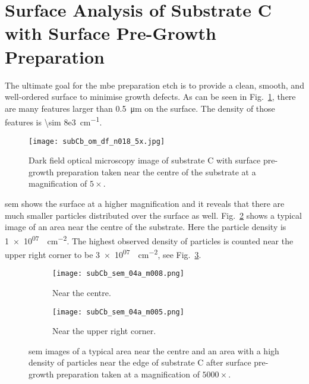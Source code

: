 \clearpage
\section[Surface Analysis of Substrate C with Surface Pre-Growth Preparation]{Surface Analysis of Substrate C with Surface Pre-Growth Preparation%
    }\label{sec:subCb}

The ultimate goal for the \ac{mbe} preparation etch is to provide a clean, smooth, and well-ordered surface to minimise growth defects. As can be seen in Fig.~\ref{fig:subCb_om_df}, there are many features larger than \SI{0.5}{\micro\metre} on the surface. The density of those features is \SI{\sim 8e3}{\centi\metre^{-1}}. 

\begin{figure}[htbp]
    \centering
    \texttt{[image: subCb\_om\_df\_n018\_5x.jpg]}
    \caption[Dark field optical microscopy image of substrate C with surface pre-growth preparation.]{Dark field optical microscopy image of substrate C with surface pre-growth preparation taken near the centre of the substrate at a magnification of $5\times$.}\label{fig:subCb_om_df}
\end{figure}

\Ac{sem} shows the surface at a higher magnification and it reveals that there are much smaller particles distributed over the surface as well. Fig.~\ref{fig:subCb_sem_typical_centre} shows a typical image of an area near the centre of the substrate. Here the particle density is  \SI{1e+07}{\particle\centi\metre^{-2}}. The highest observed density of particles is counted near the upper right corner to be \SI{3e+07}{\particle\centi\metre^{-2}}, see Fig.~\ref{fig:subCb_sem_typical_corner}.

\begin{figure}[htbp]
    \begin{subfigure}[t]{0.49\textwidth}
        \texttt{[image: subCb\_sem\_04a\_m008.png]}
        \caption{Near the centre.}\label{fig:subCb_sem_typical_centre}
    \end{subfigure}%
    \hfill
    \begin{subfigure}[t]{0.49\textwidth}
        \texttt{[image: subCb\_sem\_04a\_m005.png]}
        \caption{Near the upper right corner.}\label{fig:subCb_sem_typical_corner}
    \end{subfigure}%
    \caption[\Ac{sem} images of typical areas on substrate C with surface pre-growth preparation.]{\Acf{sem} images of a typical area near the centre and an area with a high density of particles near the edge of substrate C after surface pre-growth preparation taken at a magnification of $5000\times$.}\label{fig:subCb_sem_typical}
\end{figure}

